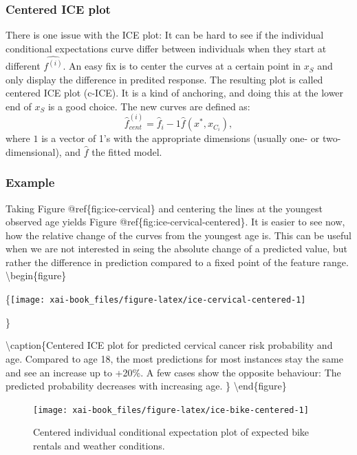 \documentclass[12pt,]{krantz}
\theoremstyle{definition}
\theoremstyle{definition}
\theoremstyle{definition}
\theoremstyle{remark}
\begin{document}
\subsubsection{Centered ICE plot}\label{centered-ice-plot}

There is one issue with the ICE plot: It can be hard to see if the
individual conditional expectations curve differ between individuals
when they start at different \(\hat{f^{(i)}}\). An easy fix is to center
the curves at a certain point in \(x_S\) and only display the difference
in predited response. The resulting plot is called centered ICE plot
(c-ICE). It is a kind of anchoring, and doing this at the lower end of
\(x_S\) is a good choice. The new curves are defined as:
\[\hat{f}_{cent}^{(i)} = \hat{f}_i - 1\hat{f}(x^{\text{*}}, x_{C_i}), \]
where \(1\) is a vector of 1's with the appropriate dimensions (usually
one- or two-dimensional), and \(\hat{f}\) the fitted model.

\subsubsection{Example}\label{example-1}

Taking Figure @ref\{fig:ice-cervical\} and centering the lines at the
youngest observed age yields Figure @ref\{fig:ice-cervical-centered\}.
It is easier to see now, how the relative change of the curves from the
youngest age is. This can be useful when we are not interested in seing
the absolute change of a predicted value, but rather the difference in
prediction compared to a fixed point of the feature range.
\textbackslash{}begin\{figure\}

\{\centering \texttt{[image: xai-book\_files/figure-latex/ice-cervical-centered-1]}

\}

\textbackslash{}caption\{Centered ICE plot for predicted cervical cancer
risk probability and age. Compared to age 18, the most predictions for
most instances stay the same and see an increase up to +20\%. A few
cases show the opposite behaviour: The predicted probability decreases
with increasing age. \}\label{fig:ice-cervical-centered}
\textbackslash{}end\{figure\}

\begin{figure}

{\centering \texttt{[image: xai-book\_files/figure-latex/ice-bike-centered-1]} 

}

\caption{Centered individual conditional expectation plot of expected bike rentals and weather conditions.}\label{fig:ice-bike-centered}
\end{figure}
\end{document}
